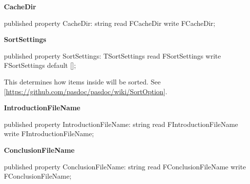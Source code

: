 \documentclass{report}
\newif\ifpdf
\begin{document}
\begin{list}{}
\begin{flushleft}
\ifpdf
\end{flushleft}
\fi


\par  \label{PasDoc_Base.TPasDoc-CacheDir}
\item[\textbf{CacheDir}\hfill]
\ifpdf
\begin{flushleft}
\fi
\begin{ttfamily}
published property CacheDir: string read FCacheDir write FCacheDir;\end{ttfamily}

\ifpdf
\end{flushleft}
\fi


\par  \label{PasDoc_Base.TPasDoc-SortSettings}
\item[\textbf{SortSettings}\hfill]
\ifpdf
\begin{flushleft}
\fi
\begin{ttfamily}
published property SortSettings: TSortSettings
      read FSortSettings write FSortSettings default [];\end{ttfamily}

\ifpdf
\end{flushleft}
\fi


\par This determines how items inside will be sorted. See [\href{https://github.com/pasdoc/pasdoc/wiki/SortOption}{https://github.com/pasdoc/pasdoc/wiki/SortOption}].\label{PasDoc_Base.TPasDoc-IntroductionFileName}
\item[\textbf{IntroductionFileName}\hfill]
\ifpdf
\begin{flushleft}
\fi
\begin{ttfamily}
published property IntroductionFileName: string read FIntroductionFileName
      write FIntroductionFileName;\end{ttfamily}

\ifpdf
\end{flushleft}
\fi


\par  \label{PasDoc_Base.TPasDoc-ConclusionFileName}
\item[\textbf{ConclusionFileName}\hfill]
\ifpdf
\begin{flushleft}
\fi
\begin{ttfamily}
published property ConclusionFileName: string read FConclusionFileName
      write FConclusionFileName;\end{ttfamily}


\end{flushleft}
\end{list}
\end{document}
